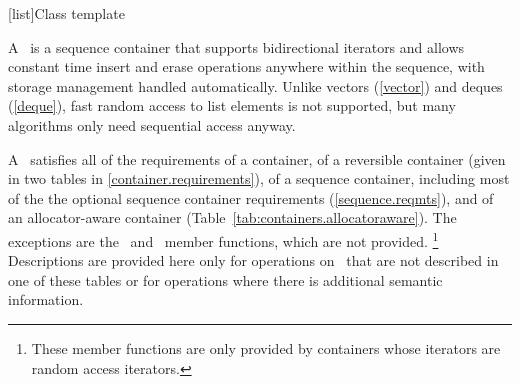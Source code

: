\documentclass[american,twoside]{book}
\begin{document}
[list]{Class template }

\pnum
{}%
A
\
is a sequence container that supports
bidirectional iterators and allows constant time insert and erase
operations anywhere within the sequence, with storage management handled
automatically. Unlike vectors (\ref{vector}) and deques (\ref{deque}),
fast random access to list elements is not supported, but many
algorithms only need sequential access anyway.

\pnum
A \ satisfies all of the requirements of a container, of
a reversible container (given in two tables in
\ref{container.requirements}), of a sequence container,
including most of the the optional sequence container
requirements (\ref{sequence.reqmts}), and of an allocator-aware container (Table~\ref{tab:containers.allocatoraware}).
The exceptions are the
\
and
\
member functions, which are not provided.%
\footnote{
These member functions are only provided by containers whose iterators
are random access iterators.
}
Descriptions are provided here only for operations on
\tcode{list}\
that are not described in one of these tables
or for operations where there is additional semantic information.
\end{document}
